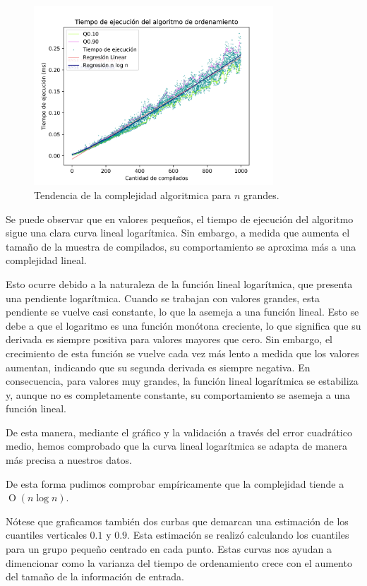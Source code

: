 \begin{figure}[H]
    \centering
    \includegraphics[width=0.8\textwidth]{img/tiempos_valores_altos_puntos.png}
    \caption{Tendencia de la complejidad algoritmica para $n$ grandes.}
    \label{fig:tiempos_valores_altos_puntos}
\end{figure}

Se puede observar que en valores pequeños, el tiempo de ejecución del algoritmo sigue una clara curva lineal logarítmica. Sin embargo, a medida
que aumenta el tamaño de la muestra de compilados, su comportamiento se aproxima más a una complejidad lineal.

Esto ocurre debido a la naturaleza de la función lineal logarítmica, que presenta una pendiente logarítmica. Cuando se 
trabajan con valores grandes, esta pendiente se vuelve casi constante, lo que la asemeja a una función lineal. Esto se 
debe a que el logaritmo es una función monótona creciente, lo que significa que su derivada es siempre positiva para valores 
mayores que cero. Sin embargo, el crecimiento de esta función se vuelve cada vez más lento a medida que los valores aumentan, 
indicando que su segunda derivada es siempre negativa. En consecuencia, para valores muy grandes, la función lineal logarítmica 
se estabiliza y, aunque no es completamente constante, su comportamiento se asemeja a una función lineal.

De esta manera, mediante el gráfico y la validación a través del error cuadrático medio, hemos comprobado que la curva lineal logarítmica 
se adapta de manera más precisa a nuestros datos.

De esta forma pudimos comprobar empíricamente que la complejidad tiende a $\operatorname{O}(n\log{n})$.

Nótese que graficamos también dos curbas que demarcan una estimación de los cuantiles verticales $0.1$ y $0.9$. Esta estimación
se realizó calculando los cuantiles para un grupo pequeño centrado en cada punto. Estas curvas nos ayudan a dimencionar como la
varianza del tiempo de ordenamiento crece con el aumento del tamaño de la información de entrada.

